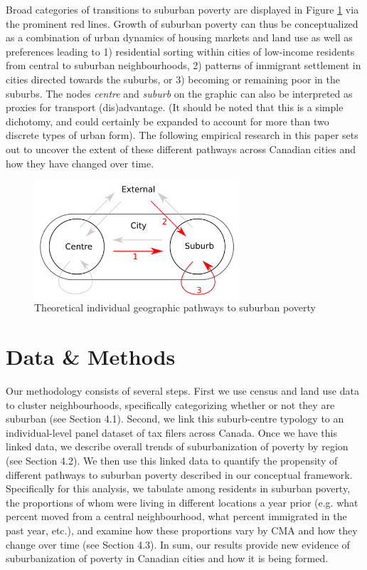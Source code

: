 Broad categories of transitions to suburban poverty are displayed in Figure \ref{path} via the prominent red lines. Growth of suburban poverty can thus be conceptualized as a combination of urban dynamics of housing markets and land use as well as preferences leading to 1) residential sorting within cities of low-income residents from central to suburban neighbourhoods, 2) patterns of immigrant settlement in cities directed towards the suburbs, or 3) becoming or remaining poor in the suburbs. The nodes \textit{centre} and \textit{suburb} on the graphic can also be interpreted as proxies for transport (dis)advantage. (It should be noted that this is a simple dichotomy, and could certainly be expanded to account for more than two discrete types of urban form). The following empirical research in this paper sets out to uncover the extent of these different pathways across Canadian cities and how they have changed over time.



\begin{figure}[h]
	\setlength{\fboxsep}{0pt}%
	\setlength{\fboxrule}{0pt}%
	\begin{center}
		\includegraphics[width=3in]{figures/pathways.png}
		\caption{Theoretical individual geographic pathways to suburban poverty}
		\label{path}
	\end{center}
\end{figure}




\section{Data \& Methods}

Our methodology consists of several steps. First we use census and land use data to cluster neighbourhoods, specifically categorizing whether or not they are suburban (see Section 4.1). Second, we link this suburb-centre typology to an individual-level panel dataset of tax filers across Canada. Once we have this linked data, we describe overall trends of suburbanization of poverty by region (see Section 4.2). We then use this linked data to quantify the propensity of different pathways to suburban poverty described in our conceptual framework. Specifically for this analysis, we tabulate among residents in suburban poverty, the proportions of whom were living in different locations a year prior (e.g. what percent moved from a central neighbourhood, what percent immigrated in the past year, etc.), and examine how these proportions vary by CMA and how they change over time (see Section 4.3). In sum, our results provide new evidence of suburbanization of poverty in Canadian cities and how it is being formed.

